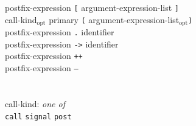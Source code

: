 \documentclass[11pt]{article}
\newcommand{\kw}[1]{{\tt #1}}
\newcommand{\opt}{$_\mbox{opt}$\xspace}
\begin{document}
{\begin{tabbing}
\>	postfix-expression \kw{[} argument-expression-list \kw{]}\\
\>	call-kind\opt primary \kw{(} argument-expression-list\opt \kw{)}\\
\>	postfix-expression \kw{.} identifier\\
\>	postfix-expression \kw{->} identifier\\
\>	postfix-expression \kw{++}\\
\>	postfix-expression \kw{--}\\
\\\\
call-kind: \emph{one of}\\
\>	\kw{call} \kw{signal} \kw{post}
\end{tabbing}}
\end{document}
